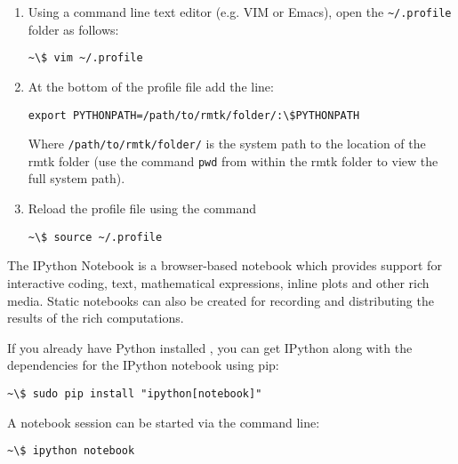 \begin{enumerate}
\item Using a command line text editor (e.g. VIM or Emacs), open the \verb=~/.profile= folder as follows:

\begin{Verbatim}[frame=single, commandchars=\\\{\}, fontsize=\scriptsize]
~\$ vim ~/.profile
\end{Verbatim}

\item At the bottom of the profile file add the line:

\begin{Verbatim}[frame=single, commandchars=\\\{\}, fontsize=\scriptsize]
export PYTHONPATH=/path/to/rmtk/folder/:\$PYTHONPATH
\end{Verbatim}

Where \verb=/path/to/rmtk/folder/= is the system path to the location of the rmtk folder (use the command \verb=pwd= from within the rmtk folder to view the full system path).

\item Reload the profile file using the command

\begin{Verbatim}[frame=single, commandchars=\\\{\}, fontsize=\scriptsize]
~\$ source ~/.profile
\end{Verbatim}

\end{enumerate}

The IPython Notebook is a browser-based notebook which provides support for interactive coding, text, mathematical expressions, inline plots and other rich media. Static notebooks can also be created for recording and distributing the results of the rich computations.

If you already have Python installed , you can get IPython along with the dependencies for the IPython notebook using pip:

\begin{Verbatim}[frame=single, commandchars=\\\{\}, fontsize=\scriptsize, samepage=true]
~\$ sudo pip install "ipython[notebook]"
\end{Verbatim}

A notebook session can be started via the command line:

\begin{Verbatim}[frame=single, commandchars=\\\{\}, fontsize=\scriptsize, samepage=true]
~\$ ipython notebook
\end{Verbatim}


